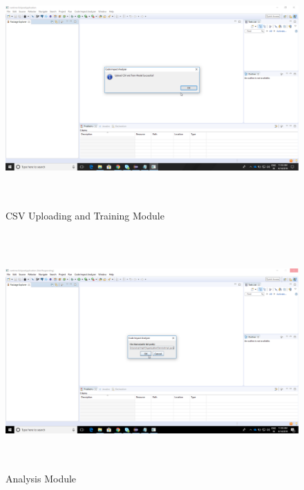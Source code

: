 \documentclass[oneside,a4paper,12pt]{book}
\begin{document}
\begin{figure}[H]
	\begin{Center}
		\includegraphics[width=5.75in,height=3.57in,scale=1.5]{adS89Logt1.png}
		\caption{CSV Uploading and Training  Module}
		\label{fig:CSV Uploading and Training Module}
	\end{Center}
\end{figure}


\begin{figure}[H]
	\begin{Center}
		\includegraphics[width=5.75in,height=3.57in,scale=1.5]{DFasdte7Tp.png}
		\caption{Analysis  Module}
		\label{fig:Analysis Module}
	\end{Center}
\end{figure}
\end{document}
